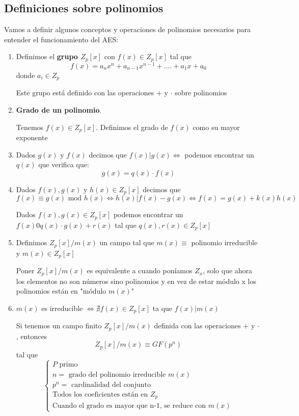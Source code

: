  \subsection{Definiciones sobre polinomios}
 Vamos a definir algunos conceptos y operaciones de polinomios necesarios para entender el funcionamiento del AES:
 \begin{enumerate}
 	\item Definimos el \textbf{grupo $Z_p[x]$} con $f(x) \in Z_p[x]$ tal que
 	$$f(x) = a_nx^n + a_{n-1}x^{n-1}+....+a_1x + a_0$$
 	donde $a_i \in Z_p$
 	
 	Este grupo está definido con las operaciones $+$ y $\cdot$ sobre polinomios
 	\item \textbf{Grado de un polinomio}.
 	
 	Tenemos $f(x)\in Z_p[x]$. Definimos el grado de $f(x)$ como su mayor exponente
 	
 	\item Dados $g(x)$ y $f(x)$ decimos que $f(x)|g(x) \iff$ podemos encontrar un $q(x)$ que verifica que:
 	$$g(x) = q(x)\cdot f(x)$$
 	
 	\item Dados $f(x), g(x)$ y $h(x) \in Z_p[x]$ decimos que
 	$$f(x)\equiv g(x) \text{ mod } h(x) \iff h(x)|f(x)-g(x) \iff f(x) = g(x) + k(x)h(x)$$
 	
 	\begin{theorem}
 		Dados $f(x), g(x) \in Z_p[x]$ podemos encontrar un $f(x) 0 q(x)\cdot g(x) + r(x)$ tal que $q(x), r(x) \in Z_p[x]$
 	\end{theorem}
 	
 	\item Definimos $Z_p[x]/m(x)$ un campo tal que $m(x)\equiv$ polinomio irreducible y $m(x)\in Z_p[x]$
 	
 	\begin{remark}
 		Poner $Z_p[x]/m(x)$ es equivalente a cuando poníamos $Z_x$, solo que ahora los elementos no son números sino polinomios y en vez de estar módulo x los polinomios están en "módulo $m(x)$"
 	\end{remark}
 	
 	\item $m(x)$ es irreducible $\iff \nexists f(x) \in Z_p[x]$ ta que $f(x)|m(x)$
 	
 	\begin{theorem}
 		Si tenemos un campo finito $Z_p[x]/m(x)$ definida con las operaciones $+$ y $\cdot$, entonces
 		$$Z_p[x]/m(x) \equiv GF(p^n)$$
 		tal que 
 		$$\begin{cases}
 		P \text{ primo}\\
 		n = \text{ grado del polinomio irreducible }m(x)\\
 		p^n = \text{  cardinalidad del conjunto}\\
 		\text{Todos los coeficientes están en }Z_p\\
 		\text{Cuando el grado es mayor que n-1, se reduce con }m(x)
 		
 		\end{cases}$$
 	\end{theorem}
 	
 \end{enumerate}
 
